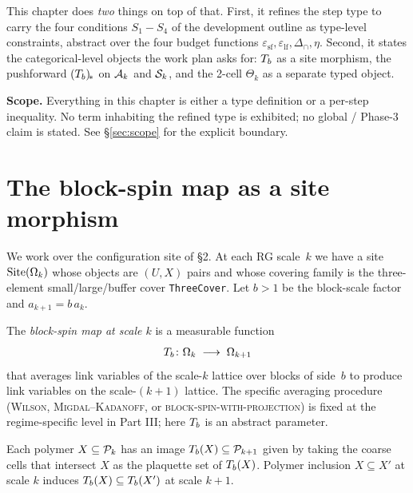 This chapter does \emph{two} things on top of that.  First, it refines the step type to carry the four conditions $S_1\!-\!S_4$ of the development outline as type-level constraints, abstract over the four budget functions $\varepsilon_{\mathrm{sf}}, \varepsilon_{\mathrm{lf}}, \Delta_{\cap}, \eta$.  Second, it states the categorical-level objects the work plan asks for: $T_b$ as a site morphism, the pushforward $(T_b)_{\!*}$ on $\mathcal{A}_k$ and $\mathcal{S}_k$, and the 2-cell $\Theta_k$ as a separate typed object.

\textbf{Scope.}  Everything in this chapter is either a type definition or a per-step inequality.  No term inhabiting the refined type is exhibited; no global / Phase-3 claim is stated.  See \S\ref{sec:scope} for the explicit boundary.

\section{The block-spin map as a site morphism}
\label{sec:site-morphism}

We work over the configuration site of  \S2.  At each RG scale~$k$ we have a site $\mathrm{Site}(\Omega_k)$ whose objects are $(U, X)$ pairs and whose covering family is the three-element small/large/buffer cover \texttt{ThreeCover}.  Let $b > 1$ be the block-scale factor and $a_{k+1} = b\, a_k$.

\begin{definition}
\label{def:T-b-config}
The \emph{block-spin map at scale $k$} is a measurable function
\begin{equation*}
  T_b \colon \Omega_k \;\longrightarrow\; \Omega_{k+1}
\end{equation*}
that averages link variables of the scale-$k$ lattice over blocks of side~$b$ to produce link variables on the scale-$(k+1)$ lattice.  The specific averaging procedure (\textsc{Wilson}, \textsc{Migdal--Kadanoff}, or \textsc{block-spin-with-projection}) is fixed at the regime-specific level in Part III; here $T_b$ is an abstract parameter.
\end{definition}

\begin{definition}
\label{def:T-b-poly}
Each polymer $X \subseteq \mathcal{P}_k$ has an image $T_b(X) \subseteq \mathcal{P}_{k+1}$ given by taking the coarse cells that intersect $X$ as the plaquette set of $T_b(X)$.  Polymer inclusion $X \subseteq X'$ at scale $k$ induces $T_b(X) \subseteq T_b(X')$ at scale $k+1$.
\end{definition}

